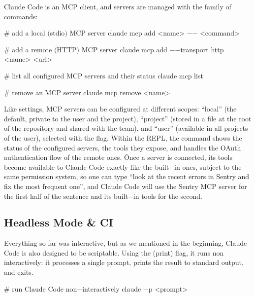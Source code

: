 Claude Code is an MCP client, and servers are managed with the  family of commands:

\begin{bash}
# add a local $($stdio$)$ MCP server
claude mcp add <name> $-$$-$ <command>
\end{bash}

\begin{bash}
# add a remote $($HTTP$)$ MCP server
claude mcp add $-$$-$transport http <name> <url>
\end{bash}

\begin{bash}
# list all configured MCP servers and their status
claude mcp list
\end{bash}

\begin{bash}
# remove an MCP server
claude mcp remove <name>
\end{bash}

Like settings, MCP servers can be configured at different scopes: ``local'' (the default, private to the user and the
project), ``project'' (stored in a  file at the root of the repository and shared with the team), and
``user'' (available in all projects of the user), selected with the  flag. Within the REPL, the
 command shows the status of the configured servers, the tools they expose, and handles the OAuth
authentication flow of the remote ones. \v

Once a server is connected, its tools become available to Claude Code exactly like the built$-$in ones, subject to the
same permission system, so one can type ``look at the recent errors in Sentry and fix the most frequent one'', and
Claude Code will use the Sentry MCP server for the first half of the sentence and its built$-$in tools for the second.

\subsection{Headless Mode \& CI}

Everything so far was interactive, but as we mentioned in the beginning, Claude Code is also designed to be
scriptable. Using the  (print) flag, it runs non interactively: it processes a single prompt, prints the
result to standard output, and exits.

\begin{bash}
# run Claude Code non$-$interactively
claude $-$p <prompt>
\end{bash}

